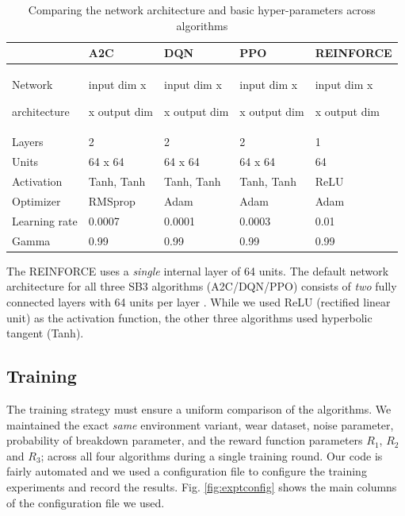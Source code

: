 \documentclass[a4paper, 12pt]{article}
\newcommand{\rowspace}[1]{\renewcommand{\arraystretch}{#1}}
\begin{document}
\begin{small}
\begin{table}\centering
	\sffamily
	\rowspace{1.5}
	\begin{tabular}[htbp]{L{2cm} R{2.5cm} R{2.5cm} R{2.5cm} R{3cm}}
		\toprule
		&\textbf{A2C}&\textbf{DQN}&\textbf{PPO}&\textbf{REINFORCE}\\ \midrule
		
		Network\par architecture&input dim x\par [64|Tanh x 64|Tanh]\par x output dim&input dim x\par [64|Tanh x 64|Tanh]\par x output dim&input dim x\par [64|Tanh x 64|Tanh]\par x output dim&input dim x\par [64|ReLU]\par x output dim\\
		Layers&2&2&2&1\\
		Units&64  x 64&64  x 64&64  x 64&64\\
		Activation&Tanh, Tanh&Tanh, Tanh&Tanh, Tanh&ReLU\\
		Optimizer&RMSprop&Adam&Adam&Adam\\ \midrule
		Learning rate&0.0007&0.0001&0.0003&0.01\\
		Gamma&0.99&0.99&0.99&0.99\\			
		\bottomrule
	\end{tabular}
	\caption{Comparing the network architecture and basic hyper-parameters across algorithms}
	\label{tbl:network-architecture}
\end{table}
\end{small}
The REINFORCE uses a \textit{single} internal layer of 64 units. The default network architecture for all three SB3 algorithms (A2C/DQN/PPO) consists of \textit{two} fully connected layers with 64 units per layer \citep{SB3-DefaultNetwork}. While we used ReLU (rectified linear unit) as the activation function, the other three algorithms used hyperbolic tangent (Tanh).

\subsection{Training}
The training strategy must ensure a uniform comparison of the algorithms. We maintained the exact \textit{same} environment variant, wear dataset, noise parameter, probability of breakdown parameter, and the reward function parameters $R_1$, $R_2$ and $R_3$; across all four algorithms during a single training round. Our code is fairly automated and we used a configuration file to configure the training experiments and record the results. Fig. \ref{fig:exptconfig} shows the main columns of the configuration file we used.
\end{document}

